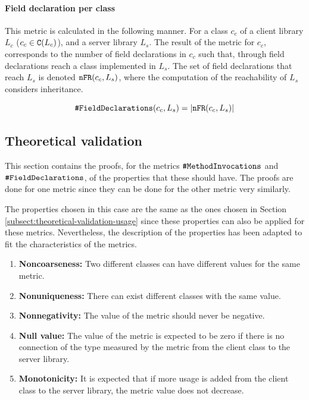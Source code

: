 \paragraph{Field declaration per class}
This metric is calculated in the following manner. For a class $c_c$ of a client library $L_c$ ($c_c \in \verb|C|(L_c)$), and a server library $L_s$. The result of the metric for $c_c$, corresponds to the number of field declarations in $c_c$ such that, through field declarations reach a class implemented in $L_s$. The set of field declarations that reach $L_s$ is denoted $\verb|nFR|(c_c, L_s)$, where the computation of the reachability of $L_s$ considers inheritance.

\begin{equation}
\label{eqn:fd}
    \verb|#FieldDeclarations|(c_c, L_s) = |\verb|nFR|(c_c, L_s)|
\end{equation}

\subsection{Theoretical validation}
This section contains the proofs, for the metrics $\verb|#MethodInvocations|$ and $\verb|#FieldDeclarations|$, of the properties that these should have. The proofs are done for one metric since they can be done for the other metric very similarly.

The properties chosen in this case are the same as the ones chosen in Section \ref{subsect:theoretical-validation-usage} since these properties can also be applied for these metrics. Nevertheless, the description of the properties has been adapted to fit the characteristics of the metrics.

\begin{enumerate}
  \item \textbf{Noncoarseness:} Two different classes can have different values for the same metric.
  \item \textbf{Nonuniqueness:} There can exist different classes with the same value.
  \item \textbf{Nonnegativity:} The value of the metric should never be negative.
  \item \textbf{Null value:} The value of the metric is expected to be zero if there is no connection of the type measured by the metric from the client class to the server library.
  \item \textbf{Monotonicity:} It is expected that if more usage is added from the client class to the server library, the metric value does not decrease.
\end{enumerate}

